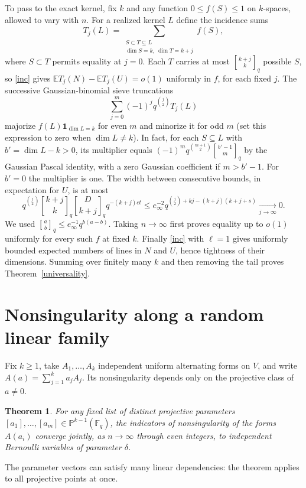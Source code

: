 \documentclass[11pt]{article}
\newtheorem{theorem}{Theorem}[section]
\newcommand{\F}{\mathbb F}
\newcommand{\E}{\mathbb E}
\newcommand{\gb}[2]{\genfrac{[}{]}{0pt}{}{#1}{#2}_{q}}
\begin{document}
To pass to the exact kernel, fix $k$ and any function $0\le f(S)\le1$ on $k$-spaces, allowed to vary with $n$. For a realized kernel $L$ define the incidence sums
\[
 T_j(L)=
 \sum_{\substack{S\subset T\subseteq L\\\dim S=k,\ \dim T=k+j}} f(S),
\]
where $S\subset T$ permits equality at $j=0$. Each $T$ carries at most $\gb{k+j}k$ possible $S$, so \eqref{inc} gives $\E T_j(N)-\E T_j(U)=o(1)$ uniformly in $f$, for each fixed $j$. The successive Gaussian-binomial sieve truncations
\[
 \sum_{j=0}^m(-1)^j q^{\binom j2} T_j(L)
\]
majorize $f(L)\mathbf1_{\dim L=k}$ for even $m$ and minorize it for odd $m$ (set this expression to zero when $\dim L\ne k$). In fact, for each $S\subseteq L$ with $b'=\dim L-k>0$, its multiplier equals
$(-1)^m q^{\binom{m+1}2}\gb{b'-1}m$ by the Gaussian Pascal identity, with a zero Gaussian coefficient if $m>b'-1$. For $b'=0$ the multiplier is one. The width between consecutive bounds, in expectation for $U$, is at most
\[
 q^{\binom j2}\gb{k+j}k\gb D{k+j}q^{-(k+j)ct}
 \le e_\infty^{-2}q^{\binom j2+kj-(k+j)(k+j+s)}
 \xrightarrow[j\to\infty]{}0 .
\]
We used $\gb ab\le e_\infty^{-1}q^{b(a-b)}$. Taking $n\to\infty$ first proves equality up to $o(1)$ uniformly for every such $f$ at fixed $k$. Finally \eqref{inc} with $\ell=1$ gives uniformly bounded expected numbers of lines in $N$ and $U$, hence tightness of their dimensions. Summing over finitely many $k$ and then removing the tail proves Theorem~\ref{universality}.

\section{Nonsingularity along a random linear family}
Fix $k\ge1$, take $A_1,\ldots,A_k$ independent uniform alternating forms on $V$, and write $A(a)=\sum_{j=1}^k a_j A_j$. Its nonsingularity depends only on the projective class of $a\ne0$.
\begin{theorem}\label{marks}
For any fixed list of distinct projective parameters $[a_1],\ldots,[a_m]\in\mathbb P^{k-1}(\F_q)$, the indicators of nonsingularity of the forms $A(a_i)$ converge jointly, as $n\to\infty$ through even integers, to independent Bernoulli variables of parameter $\delta$.
\end{theorem}
The parameter vectors can satisfy many linear dependencies: the theorem applies to all projective points at once.
\end{document}
